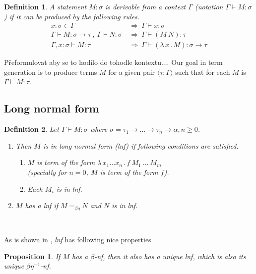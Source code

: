 \documentclass{sig-alternate}
\newtheorem{definition}{Definition}
\newtheorem{proposition}{Proposition}
\newcommand{\tur}[3]{#1\vdash{}#2 \colon #3}
\newcommand{\turst}[3]{$#1\vdash{}#2:#3$\xspace}
\newcommand{\GMS}{\turst{\Gamma}{M}{\sigma}}
\newcommand{\then}{\Rightarrow\xspace}
\newcommand{\lamb}[2]{( \lambda \, #1 \, . \, #2 )}
\newcommand{\lam}[2]{\lambda \, #1 \, . \, #2}
\newcommand{\bnf}{$\beta$-\textit{nf}\xspace}
\newcommand{\beenf}{$\beta\eta^{-1}$-\textit{nf}\xspace}
\newcommand{\lnf}{\textit{lnf}\xspace}
\newcommand{\ar}{\rightarrow\xspace}
\newcommand{\ul}[2]{\langle #1 ; #2 \rangle}
\begin{document}
\begin{definition}
A statement $M\colon\sigma$ is \textit{derivable from}
a context $\Gamma$ (notation 
\mbox{$\Gamma\vdash{}M\colon\sigma$}) 
if it can be produced by the following rules.
\begin{align*}
x : \sigma \in \Gamma &~\then~ \tur{\Gamma}{x}{\sigma}\\
\tur{\Gamma}{M}{\sigma \ar \tau}~,~\tur{\Gamma}{N}{\sigma} 
&~\then~ \tur{\Gamma}{(M~N)}{\tau}\\  
\tur{\Gamma,x:\sigma}{M}{\tau}
&~\then~ \tur{\Gamma}{\lamb{x}{M}}{\sigma \ar \tau} 
\end{align*}
\end{definition}

Přeformulovat aby se to hodilo do tohodle kontextu....
Our goal in term generation is to produce terms $M$
for a given pair $\ul{\tau}{\Gamma}$
such that for each $M$ is $\tur{\Gamma}{M}{\tau}$.


\subsection{Long normal form}
\label{lnf}


\begin{definition}
Let \GMS where 
$\sigma = \tau_1 \ar \dots \ar \tau_n \ar \alpha, n \geq 0$.
	\begin{enumerate}
	  \item	
		Then $M$ is in \textit{long normal form} (\lnf) if following 
		conditions are satisfied.
		\begin{enumerate}
		 \item $M$ is term of the form $\lam{x_1 \dots x_n}{f~M_1~\dots~M_m}$\\
		  (specially for $n = 0$, $M$ is term of the form $f$).
		 \item Each $M_i$ is in \lnf.
		\end{enumerate}	
	  \item 
	    $M$ has a \lnf if $M =_{\beta\eta} N$ and $N$ is in \lnf.
	\end{enumerate}
\end{definition}~

As is shown in \cite{barendregt10}, \lnf has following nice properties.

\begin{proposition}
If $M$ has a \bnf, 
then it also has a unique \lnf, 
which is also its unique \beenf.
\end{proposition}
\end{document}
